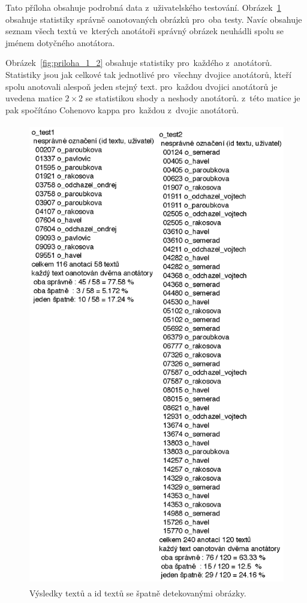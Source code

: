 \label{app:testing}

Tato příloha obsahuje podrobná data z~uživatelského testování. Obrázek~\ref{fig:priloha_1_1} obsahuje statistiky správně oanotovaných obrázků pro~oba testy. Navíc obsahuje seznam všech textů ve~kterých anotátoři správný obrázek neuhádli spolu se jménem dotyčného anotátora.

Obrázek~\ref{fig:priloha_1_2} obsahuje statistiky pro~každého z~anotátorů. Statistiky jsou jak celkové tak jednotlivé pro~všechny dvojice anotátorů, kteří spolu anotovali alespoň jeden stejný text. pro~každou dvojici anotátorů je uvedena matice $2\times2$ se statistikou shody a neshody anotátorů. z~této matice je pak spočítáno Cohenovo kappa pro~každou z~dvojic anotátorů.

\begin{figure}[h]
  \centering
  \includegraphics[height=8in]{priloha_1_1.eps}
  \caption{Výsledky textů a id textů se špatně detekovanými obrázky.}
  \label{fig:priloha_1_1}
\end{figure}


